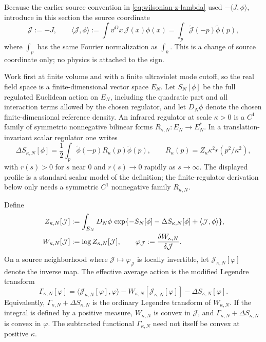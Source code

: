 Because the earlier source convention in
\eqref{eq:wilsonian-z-lambda} used \(-\langle J,\phi\rangle\), introduce in
this section the source coordinate
\[
  \mathcal J:=-J,
  \qquad
  \langle \mathcal J,\phi\rangle
  :=
  \int\dd^Dx\,\mathcal J(x)\phi(x)
  =
  \int_p \widetilde{\mathcal J}(-p)\widetilde\phi(p),
\]
where \(\int_p\) has the same Fourier normalization as \(\int_k\).  This is a
change of source coordinate only; no physics is attached to the sign.

\begin{definition}
\label{def:effective-average-action}
Work first at finite volume and with a finite ultraviolet mode cutoff, so the
real field space is a finite-dimensional vector space \(E_N\).  Let
\(S_N[\phi]\) be the full regulated Euclidean action on \(E_N\), including the
quadratic part and all interaction terms allowed by the chosen regulator, and
let \(D_N\phi\) denote the chosen finite-dimensional reference density.  An
infrared regulator at scale \(\kappa>0\) is a \(C^1\) family of symmetric
nonnegative bilinear forms \(R_{\kappa,N}:E_N\to E_N^*\).  In a
translation-invariant scalar regulator one writes
\begin{equation}
  \Delta S_{\kappa,N}[\phi]
  =
  \frac12\int_p
  \widetilde\phi(-p) R_\kappa(p)\widetilde\phi(p),
  \qquad
  R_\kappa(p)=Z_\kappa\kappa^2 r(p^2/\kappa^2),
  \label{eq:eaa-ir-regulator}
\end{equation}
with \(r(s)>0\) for \(s\) near \(0\) and \(r(s)\to0\) rapidly as
\(s\to\infty\).  The displayed profile is a standard scalar model of the
definition; the finite-regulator derivation below only needs a symmetric
\(C^1\) nonnegative family \(R_{\kappa,N}\).

Define
\begin{align}
  Z_{\kappa,N}[\mathcal J]
  &:=
  \int_{E_N}D_N\phi\,
  \exp\{-S_N[\phi]-\Delta S_{\kappa,N}[\phi]
       +\langle \mathcal J,\phi\rangle\},
  \notag\\
  W_{\kappa,N}[\mathcal J]&:=\log Z_{\kappa,N}[\mathcal J],
  \qquad
  \varphi_{\mathcal J}
  :=
  \frac{\delta W_{\kappa,N}}{\delta\mathcal J}.
  \label{eq:eaa-z-w-average-field}
\end{align}
On a source neighborhood where
\(\mathcal J\mapsto\varphi_{\mathcal J}\) is locally invertible, let
\(\mathcal J_{\kappa,N}[\varphi]\) denote the inverse map.  The effective
average action is the modified Legendre transform
\begin{equation}
  \Gamma_{\kappa,N}[\varphi]
  =
  \langle \mathcal J_{\kappa,N}[\varphi],\varphi\rangle
  -W_{\kappa,N}[\mathcal J_{\kappa,N}[\varphi]]
  -\Delta S_{\kappa,N}[\varphi].
  \label{eq:effective-average-action-definition}
\end{equation}
Equivalently, \(\Gamma_{\kappa,N}+\Delta S_{\kappa,N}\) is the ordinary
Legendre transform of \(W_{\kappa,N}\).  If the integral is defined by a
positive measure, \(W_{\kappa,N}\) is convex in \(\mathcal J\), and
\(\Gamma_{\kappa,N}+\Delta S_{\kappa,N}\) is convex in \(\varphi\).  The
subtracted functional \(\Gamma_{\kappa,N}\) need not itself be convex at
positive \(\kappa\).
\end{definition}

